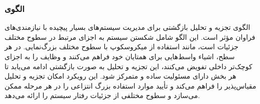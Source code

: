 \subsubsection{الگوی }
\label{archRecContainSec}
\begin{RTL}
الگوی تجزیه و تحلیل بازگشتی برای مدیریت سیستم‌های بسیار پیچیده
با نیازمندی‌های فراوان مؤثر است. این الگو شامل شکستن سیستم به
اجزای مرتبط در سطوح مختلف جزئیات است، مانند استفاده از میکروسکوپ
با سطوح مختلف بزرگ‌نمایی. در هر سطح، اشیاء واسط‌هایی
برای همتایان خود فراهم می‌کنند و وظایف را به اجزای کوچک‌تر داخلی
تفویض می‌کنند، این تجزیه و تحلیل به صورت بازگشتی ادامه می‌یابد
تا هر بخش دارای مسئولیت ساده و متمرکز شود. این رویکرد امکان تجزیه
و تحلیل مقیاس‌پذیر را فراهم می‌کند و تأیید موارد استفاده بزرگ انتزاعی
را در هر مرحله ممکن می‌سازد و سطوح مختلفی از جزئیات رفتار سیستم را ارائه می‌دهد.
\end{RTL}